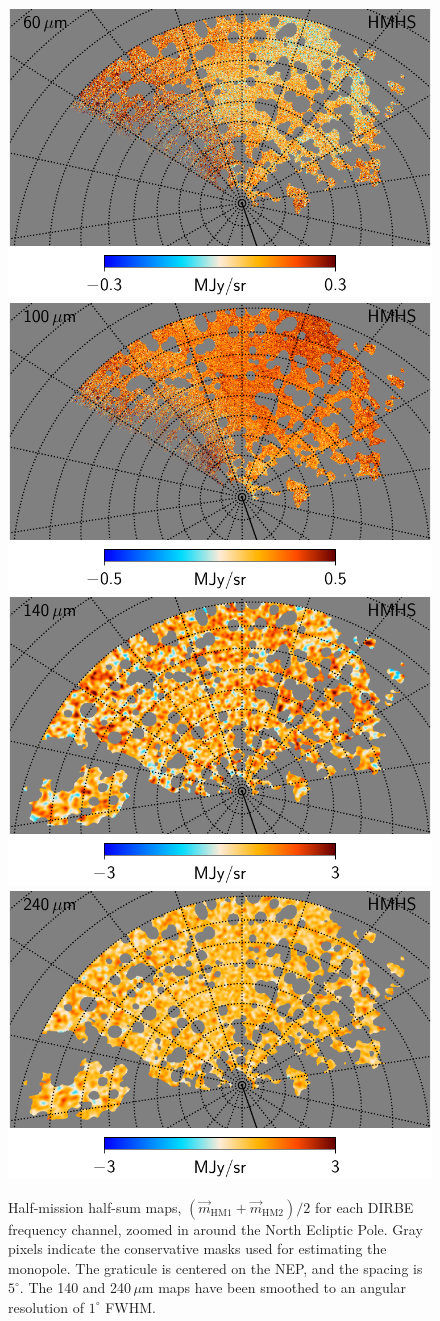 \documentclass{aa}
\newcommand{\m}[0]{\vec{m}}
\begin{document}
\begin{figure}
  \includegraphics[width=0.376\linewidth]{figs/CGDR2_07_hmhs_fullres.pdf}\hspace*{5mm}
  \includegraphics[width=0.376\linewidth]{figs/CGDR2_08_hmhs_fullres.pdf}\\
  \includegraphics[width=0.376\linewidth]{figs/CGDR2_09_hmhs_fullres_1deg.pdf}\hspace*{5mm}
  \includegraphics[width=0.376\linewidth]{figs/CGDR2_10_hmhs_fullres_1deg.pdf}
  \caption{Half-mission half-sum maps, $(\m_{\mathrm{HM1}}+\m_{\mathrm{HM2}})/2$ for each DIRBE frequency channel, zoomed in around the North Ecliptic Pole. Gray pixels indicate the conservative masks used for estimating the monopole. The graticule is centered on the NEP, and the spacing is $5^{\circ}$. The 140 and 240\,$\mu\mathrm{m}$ maps have been smoothed to an angular resolution of $1^{\circ}$ FWHM.} 
  \label{fig:hmhs_zoom}
\end{figure}
\end{document}
